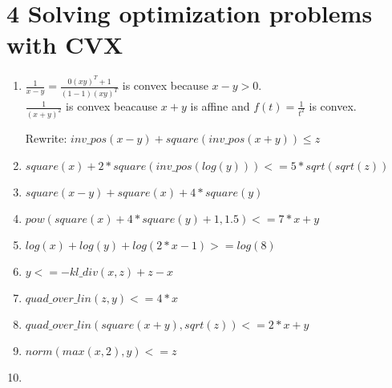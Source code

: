 \documentclass[12pt,letterpaper]{article}
\begin{document}
\newpage
\section*{4 Solving optimization problems with CVX}

\begin{alphalist}
    \item
    \item
        \begin{enumerate}
            \item $\frac{1}{x - y} = \frac{0 (x y)^T + 1}{(1 -1)(x y)^T}$ is
                convex because $x - y > 0$.\\
                $\frac{1}{(x + y)^2}$ is convex beacause ${x + y}$ is affine
                and $f(t) = \frac{1}{t^2}$ is convex.

                Rewrite: $inv\_pos(x - y) + square(inv\_pos(x+y)) \le z$

            \item $square(x) + 2 * square(inv\_pos(log(y))) <= 5 * sqrt(sqrt(z))$
            \item $square(x - y) + square(x) + 4 * square(y)$
            \item $pow(square(x) + 4 * square(y) + 1, 1.5) <= 7 * x + y$
            \item $log(x) + log(y) + log(2 * x - 1) >= log(8)$
            \item $y <= -kl\_div(x, z) + z - x$
            \item $quad\_over\_lin(z, y) <= 4 * x$
            \item $quad\_over\_lin(square(x + y), sqrt(z)) <= 2 * x + y$
            \item $norm(max(x, 2), y) <= z$
            \item 


        \end{enumerate}
\end{alphalist}
\end{document}
